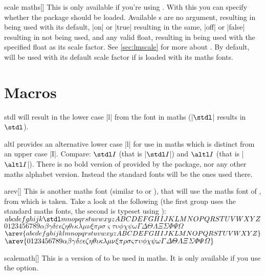 \begin{describeopt}{scale maths}[]
  This is only available if you're using . With this you can
  specify whether the  package should be loaded. Available
  s are no argument, resulting in  being used with
  its default, |on| or |true| resulting in the same, |off| or |false| resulting
  in  not being used, and any valid float, resulting in
   being used with the specified float as its scale factor. See
  \autoref{sec:lmscale} for more about . By default,
   will be used with its default scale factor if 
  is loaded with its maths fonts.
\end{describeopt}

\section{Macros}\label{sec:fonts:macros}
\begin{describemacro}{stdl}
   will result in the lower case |l| from the  font in
  maths (\bverb|$\stdl$| results in $\stdl$).
\end{describemacro}
\begin{describemacro}{altl}
   provides an alternative lower case |l| for use in maths which is
  distinct from an upper case |I|. Compare: $\stdl I$ (that is |$\stdl I$|) and
  $\altl I$ (that is |$\altl I$|). There is no bold version of 
  provided by the package, nor any other maths alphabet version. Instead the
  standard fonts will be the ones used there.
\end{describemacro}
\begin{describemacro}{arev}[]
  This is another maths font (similar to  or ), that will
  use the maths font of , from which  is taken. Take a
  look at the following (the first group uses the standard maths fonts, the
  second is typeset using ):\\[\parskip]
  $abcdefghijk\stdl mnopqrstuvwxyzABCDEFGHIJKLMNOPQRSTUVWXYZ$\\
  $
    0123456789
    \alpha\beta\gamma\delta\varepsilon\epsilon\zeta\eta\theta\iota\kappa\lambda
    \mu\nu\xi\pi\rho\sigma\varsigma\tau\upsilon\phi\chi\psi\omega
    \Gamma\Delta\Theta\Lambda\Xi\Sigma\Phi\Psi\Omega
  $\\[\parskip]
  $\arev{abcdefghijklmnopqrstuvwxyzABCDEFGHIJKLMNOPQRSTUVWXYZ}$\\
  $\arev{
    0123456789
    \alpha\beta\gamma\delta\varepsilon\epsilon\zeta\eta\theta\iota\kappa\lambda
    \mu\nu\xi\pi\rho\sigma\varsigma\tau\upsilon\phi\chi\psi\omega
    \Gamma\Delta\Theta\Lambda\Xi\Sigma\Phi\Psi\Omega
  }$
\end{describemacro}
\begin{describemacro}{scalemath}[]
  This is a version of  to be used in maths. It is only available
  if you use the  option.
\end{describemacro}

